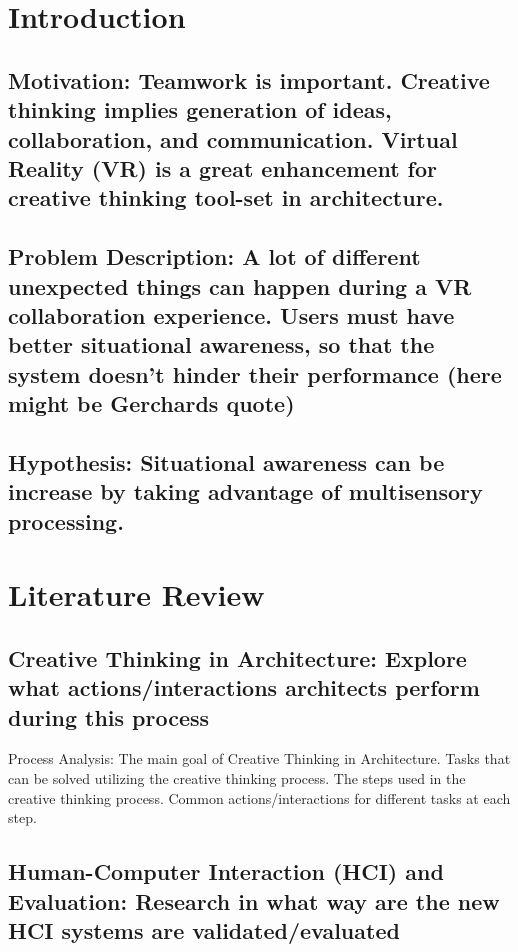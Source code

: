 
\chapter{Introduction}\label{chapter:introduction}
\section{Motivation: Teamwork is important. Creative thinking implies generation of ideas, collaboration, and communication. Virtual Reality (VR) is a great enhancement for creative thinking tool-set in architecture.}

\section{Problem Description: A lot of different unexpected things can happen during a VR collaboration experience. Users must have better situational awareness, so that the system doesn't hinder their performance (here might be Gerchards quote)}

\section{Hypothesis: Situational awareness can be increase by taking advantage of multisensory processing.}


\chapter{Literature Review}
\section{Creative Thinking in Architecture: Explore what actions/interactions architects perform during this process} %
Process Analysis: The main goal of Creative Thinking in Architecture. Tasks that can be solved utilizing the creative thinking process. The steps used in the creative thinking process. Common actions/interactions for different tasks at each step.

\section{Human-Computer Interaction (HCI) and Evaluation: Research in what way are the new HCI systems are validated/evaluated}
